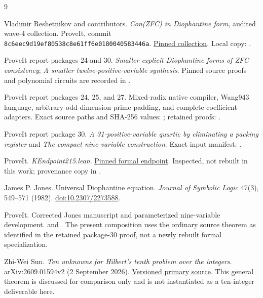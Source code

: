 \clearpage
\begin{thebibliography}{9}
\small\raggedright

Vladimir Reshetnikov and contributors.
\emph{Con(ZFC) in Diophantine form}, audited wave-4 collection.
ProveIt, commit \texttt{8c6eec9d19ef80538c8e61ff6e0180040583446a}.
\href{https://github.com/VladimirReshetnikov/ProveIt/tree/8c6eec9d19ef80538c8e61ff6e0180040583446a/SetTheory/Cardinals/docs/reports/hilbert-tenth-problem/con-zfc-diophantine-forms}{Pinned collection}.
Local copy: .

ProveIt report packages 24 and 30.
\emph{Smaller explicit Diophantine forms of ZFC consistency};
\emph{A smaller twelve-positive-variable synthesis}.
Pinned source proofs and polynomial circuits are recorded in
.

ProveIt report packages 24, 25, and 27.
Mixed-radix native compiler, Wang943 language, arbitrary-odd-dimension
prime padding, and complete coefficient adapters.
Exact source paths and SHA-256 values:
; retained proofs:
.

ProveIt report package 30.
\emph{A 31-positive-variable quartic by eliminating a packing register}
and \emph{The compact nine-variable construction}.
Exact input manifest: .

ProveIt. \emph{KEndpoint215.lean}.
\href{https://github.com/VladimirReshetnikov/ProveIt/blob/8c6eec9d19ef80538c8e61ff6e0180040583446a/Computability/BusyBeaver/Lean/BusyBeaver/ZFC/KEndpoint215.lean}{Pinned formal endpoint}.
Inspected, not rebuilt in this work; provenance copy in .

James P. Jones. Universal Diophantine equation.
\emph{Journal of Symbolic Logic} 47(3), 549--571 (1982).
\href{https://doi.org/10.2307/2273588}{doi:10.2307/2273588}.

ProveIt. Corrected Jones manuscript and parameterized nine-variable
development.  and
.
The present composition uses the ordinary source theorem as identified in
the retained package-30 proof, not a newly rebuilt formal specialization.

Zhi-Wei Sun. \emph{Ten unknowns for Hilbert's tenth problem over the integers}.
arXiv:2609.01594v2 (2 September 2026).
\href{https://arxiv.org/html/2609.01594v2}{Versioned primary source}.
This general theorem is discussed for comparison only and is not instantiated
as a ten-integer deliverable here.

\end{thebibliography}
